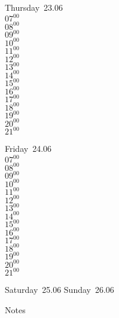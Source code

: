 \documentclass[11pt,a4paper]{book}\usepackage[]{graphicx}\usepackage[]{color}
\begin{document}
\clearpage
\begin{headerbox}
\end{headerbox}
\begin{weekdaybox}
  Thursday~23.06\\
  { 
  \vfill
  $07^{00}$\\
$08^{00}$\\
$09^{00}$\\
$10^{00}$\\
$11^{00}$\\
$12^{00}$\\
$13^{00}$\\
$14^{00}$\\
$15^{00}$\\
$16^{00}$\\
$17^{00}$\\
$18^{00}$\\
$19^{00}$\\
$20^{00}$\\
$21^{00}$\\
  }
\end{weekdaybox} 
\begin{weekdaybox}
  Friday~24.06\\
  { 
  \vfill
  $07^{00}$\\
$08^{00}$\\
$09^{00}$\\
$10^{00}$\\
$11^{00}$\\
$12^{00}$\\
$13^{00}$\\
$14^{00}$\\
$15^{00}$\\
$16^{00}$\\
$17^{00}$\\
$18^{00}$\\
$19^{00}$\\
$20^{00}$\\
$21^{00}$\\
  }
\end{weekdaybox}
\begin{weekendbox}
  Saturday~25.06
  \tcblower
  Sunday~26.06
\end{weekendbox} %
\begin{notebox}
  Notes
\end{notebox}
\clearpage
\end{document}
